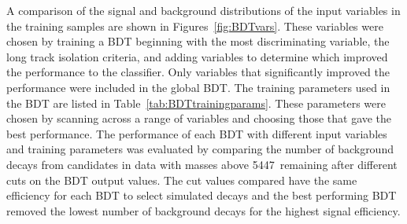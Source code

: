 A comparison of the signal and background distributions of the input variables in the training samples are shown in Figures~\ref{fig:BDTvars}. These variables were chosen by training a BDT beginning with the most discriminating variable, the long track isolation criteria, and adding variables to determine which improved the performance to the classifier. Only variables that significantly improved the performance were included in the global BDT. The training parameters used in the BDT are listed in Table~\ref{tab:BDTtrainingparams}. These parameters were chosen by scanning across a range of variables and choosing those that gave the best performance. 
The performance of each BDT with different input variables and training parameters was evaluated by comparing the number of background decays from \bmumu candidates in data with masses above 5447~\mevcc remaining after different cuts on the BDT output values. The cut values compared have the same efficiency for each BDT to select simulated \bsmumu decays and the best performing BDT removed the lowest number of background decays for the highest signal efficiency.
